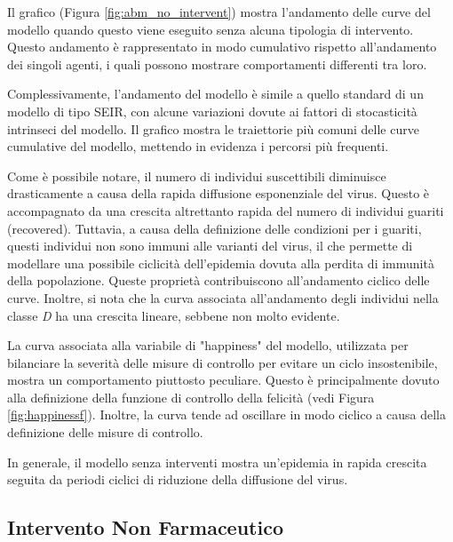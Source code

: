 Il grafico (Figura \ref{fig:abm_no_intervent}) mostra 
l'andamento delle curve del modello quando questo viene eseguito 
senza alcuna tipologia di intervento. Questo andamento è rappresentato 
in modo cumulativo rispetto all'andamento dei singoli agenti, 
i quali possono mostrare comportamenti differenti tra loro.

Complessivamente, l'andamento del modello è simile a quello 
standard di un modello di tipo SEIR, con alcune variazioni 
dovute ai fattori di stocasticità intrinseci del modello. 
Il grafico mostra le traiettorie più comuni delle curve cumulative 
del modello, mettendo in evidenza i percorsi più frequenti.

Come è possibile notare, il numero di individui suscettibili 
diminuisce drasticamente a causa della rapida diffusione 
esponenziale del virus. Questo è accompagnato da una crescita 
altrettanto rapida del numero di individui guariti (recovered). 
Tuttavia, a causa della definizione delle condizioni per i guariti, 
questi individui non sono immuni alle varianti del virus, il che 
permette di modellare una possibile ciclicità dell'epidemia 
dovuta alla perdita di immunità della popolazione. 
Queste proprietà contribuiscono all'andamento ciclico delle curve. 
Inoltre, si nota che la curva associata all'andamento degli 
individui nella classe \emph{D} ha una crescita lineare, 
sebbene non molto evidente.

La curva associata alla variabile di "happiness" del modello, 
utilizzata per bilanciare la severità delle misure di controllo 
per evitare un ciclo insostenibile, mostra un comportamento 
piuttosto peculiare. Questo è principalmente dovuto alla 
definizione della funzione di controllo della felicità 
(vedi Figura \ref{fig:happinessf}). Inoltre, la curva tende 
ad oscillare in modo ciclico a causa della definizione delle 
misure di controllo.

In generale, il modello senza interventi mostra un'epidemia in 
rapida crescita seguita da periodi ciclici di riduzione della 
diffusione del virus.

\subsection{Intervento Non Farmaceutico}

